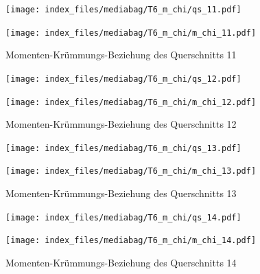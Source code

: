 \documentclass[
  11pt,
  letterpaper,
]{scrreprt}
\begin{document}
\begin{figure}[H]

\begin{minipage}{0.50\linewidth}
\texttt{[image: index\_files/mediabag/T6\_m\_chi/qs\_11.pdf]}\end{minipage}%
%
\begin{minipage}{0.50\linewidth}
\texttt{[image: index\_files/mediabag/T6\_m\_chi/m\_chi\_11.pdf]}\end{minipage}%

\caption{\label{fig-m_chi_appendix}Momenten-Krümmungs-Beziehung des
Querschnitts 11}

\end{figure}%

\begin{figure}[H]

\begin{minipage}{0.50\linewidth}
\texttt{[image: index\_files/mediabag/T6\_m\_chi/qs\_12.pdf]}\end{minipage}%
%
\begin{minipage}{0.50\linewidth}
\texttt{[image: index\_files/mediabag/T6\_m\_chi/m\_chi\_12.pdf]}\end{minipage}%

\caption{\label{fig-m_chi_appendix}Momenten-Krümmungs-Beziehung des
Querschnitts 12}

\end{figure}%

\begin{figure}[H]

\begin{minipage}{0.50\linewidth}
\texttt{[image: index\_files/mediabag/T6\_m\_chi/qs\_13.pdf]}\end{minipage}%
%
\begin{minipage}{0.50\linewidth}
\texttt{[image: index\_files/mediabag/T6\_m\_chi/m\_chi\_13.pdf]}\end{minipage}%

\caption{\label{fig-m_chi_appendix}Momenten-Krümmungs-Beziehung des
Querschnitts 13}

\end{figure}%

\begin{figure}[H]

\begin{minipage}{0.50\linewidth}
\texttt{[image: index\_files/mediabag/T6\_m\_chi/qs\_14.pdf]}\end{minipage}%
%
\begin{minipage}{0.50\linewidth}
\texttt{[image: index\_files/mediabag/T6\_m\_chi/m\_chi\_14.pdf]}\end{minipage}%

\caption{\label{fig-m_chi_appendix}Momenten-Krümmungs-Beziehung des
Querschnitts 14}

\end{figure}%
\end{document}
